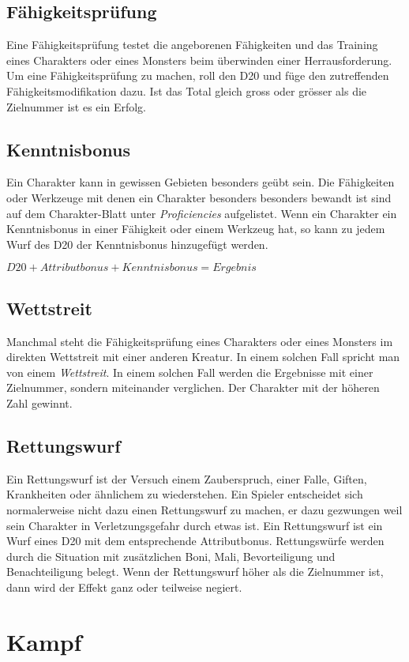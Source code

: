 \documentclass[paper=landscape,twocolumn=true,pagesize,DIV=14,fontsize=9pt]{scrartcl}
\begin{document}
\subsection{Fähigkeitsprüfung}
Eine Fähigkeitsprüfung testet die angeborenen Fähigkeiten und das Training eines Charakters oder eines Monsters beim überwinden einer Herrausforderung.
Um eine Fähigkeitsprüfung zu machen, roll den D20 und füge den zutreffenden Fähigkeitsmodifikation dazu.
Ist das Total gleich gross oder grösser als die Zielnummer ist es ein Erfolg.
\subsection{Kenntnisbonus}
Ein Charakter kann in gewissen Gebieten besonders geübt sein. Die Fähigkeiten oder Werkzeuge mit denen ein Charakter besonders besonders bewandt ist sind auf dem Charakter-Blatt unter \textit{Proficiencies} aufgelistet. 
Wenn ein Charakter ein Kenntnisbonus in einer Fähigkeit oder einem Werkzeug hat, so kann zu jedem Wurf des D20 der Kenntnisbonus hinzugefügt werden.

\(D20 + Attributbonus + Kenntnisbonus = Ergebnis\)
\subsection{Wettstreit}
Manchmal steht die Fähigkeitsprüfung eines Charakters oder eines Monsters im direkten Wettstreit mit einer anderen Kreatur. In einem solchen Fall spricht man von einem \textit{Wettstreit}. In einem solchen Fall werden die Ergebnisse mit einer Zielnummer, sondern miteinander verglichen. Der Charakter mit der höheren Zahl gewinnt.
\subsection{Rettungswurf}
Ein Rettungswurf ist der Versuch einem Zauberspruch, einer Falle, Giften, Krankheiten oder ähnlichem zu wiederstehen.
Ein Spieler entscheidet sich normalerweise nicht dazu einen Rettungswurf zu machen, er dazu gezwungen weil sein Charakter in Verletzungsgefahr durch etwas ist.
Ein Rettungswurf ist ein Wurf eines D20 mit dem entsprechende Attributbonus. Rettungswürfe werden durch die Situation mit zusätzlichen Boni, Mali, Bevorteiligung und Benachteiligung belegt.
Wenn der Rettungswurf höher als die Zielnummer ist, dann wird der Effekt ganz oder teilweise negiert. 
\section{Kampf}
\end{document}
